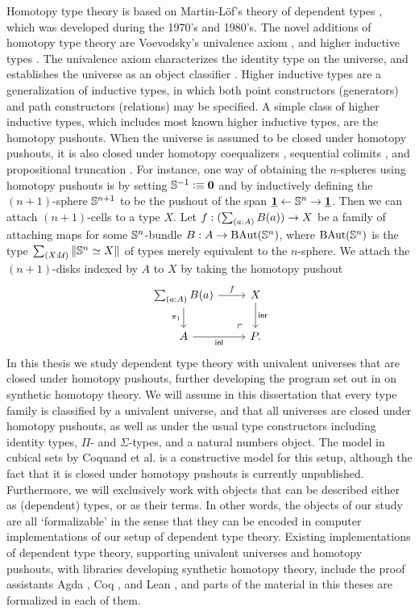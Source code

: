 Homotopy type theory is based on Martin-L\"of's theory of dependent types \cite{MartinLof1984}, which
was developed during the 1970's and 1980's.
The novel additions of homotopy type theory are Voevodsky's univalence axiom \cite{Voevodsky06,Voevodsky10},
and higher inductive types \cite{Lumsdaine11Blog,Shulman11Blog,hottbook}. The univalence axiom characterizes the identity
type on the universe, and establishes the universe as an object classifier \cite{RijkeSpitters}.
Higher inductive types are a generalization of inductive types, in which both
point constructors (generators) and path constructors (relations) may be specified.
A simple class of higher inductive types, which includes most known higher inductive
types, are the homotopy pushouts. When the universe is assumed to be closed
under homotopy pushouts, it is also closed under homotopy coequalizers \cite{hottbook}, 
sequential colimits \cite{hottbook}, and propositional truncation \cite{vanDoorn2016}.
For instance, one way of obtaining the $n$-spheres \cite{Lumsdaine12Blog} using homotopy pushouts is by setting $\mathbb{S}^{-1}\vcentcolon\equiv\mathbf{0}$ and
by inductively defining the $(n+1)$-sphere $\mathbb{S}^{n+1}$ to be the pushout
of the span $\underline{\mathbf{1}} \leftarrow\mathbb{S}^{n}\rightarrow\underline{\mathbf{1}}$. 
Then we can attach $(n+1)$-cells to a type $X$.
Let $f:(\sm{a:A}B(a))\to X$ be a family of attaching maps
for some $\mathbb{S}^{n}$-bundle $B:A\to\mathrm{BAut}(\mathbb{S}^{n})$, where $\mathrm{BAut}(\mathbb{S}^{n})$ is the type $\sm{X:\UU}\brck{\eqv{\sphere{n}}{X}}$ of types merely equivalent to the $n$-sphere. We
attach the $(n+1)$-disks indexed by $A$ to $X$ by taking the homotopy pushout
\begin{equation*}
\begin{tikzcd}
\sm{a:A}B(a) \arrow[r,"f"] \arrow[d,swap,"\pi_1"]  & X \arrow[d,"\inr"] \\
A \arrow[r,swap,"\inl"] & P. \arrow[ul,phantom,very near start,"\ulcorner"]
\end{tikzcd}
\end{equation*}
In this thesis we study dependent type theory with univalent universes that are closed under homotopy pushouts, further developing the program set out in \cite{hottbook} on synthetic homotopy theory. We will assume in this dissertation that every type family is classified by a univalent universe, and that all universes are closed under homotopy pushouts, as well as under the usual type constructors including identity types, $\Pi$- and $\Sigma$-types, and a natural numbers object. The model in cubical sets by Coquand et al. \cite{BezemCoquandHuber} is a constructive model for this setup, although the fact that it is closed under homotopy pushouts is currently unpublished. Furthermore, we will exclusively work with objects that can be described either as (dependent) types, or as their terms. In other words, the objects of our study are all `formalizable' in the sense that they can be encoded in computer implementations of our setup of dependent type theory. Existing implementations of dependent type theory, supporting univalent universes and homotopy pushouts, with libraries developing synthetic homotopy theory, include the proof assistants Agda \cite{agda}, Coq \cite{Coq,hcoq}, and Lean \cite{vDvRB2017HoTTLean}, and parts of the material in this theses are formalized in each of them. 

